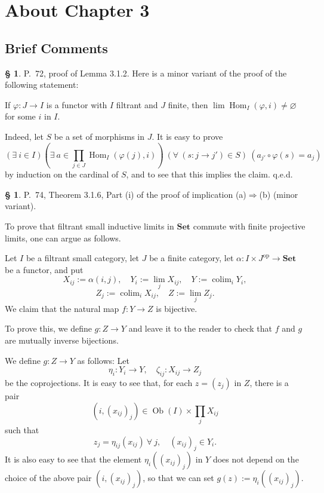 \documentclass[12pt]{article}
\theoremstyle{remark}
\theoremstyle{definition}
\newtheorem{s}[thm]{\S}
\newcommand{\Set}{\mathbf{Set}}
\newcommand{\pp}{\varphi}
\newcommand{\then}{\Rightarrow}
\DeclareMathOperator*{\colim}{colim}
\DeclareMathOperator{\Hom}{Hom}
\DeclareMathOperator{\Ob}{Ob}
\DeclareMathOperator{\op}{op}
\begin{document}

\section{About Chapter 3}

\subsection{Brief Comments}

\begin{s} 
P.~72, proof of Lemma 3.1.2. Here is a minor variant of the proof of the following statement: 

If $\pp:J\to I$ is a functor with $I$ filtrant and $J$ finite, then $\lim\Hom_I(\pp,i)\neq\varnothing$ for some $i$ in $I$. 

Indeed, let $S$ be a set of morphisms in $J$. It is easy to prove 
$$
(\exists\ i\in I)\left(\exists\ a\in\prod_{j\in J}\Hom_I(\pp(j),i)\right)\ (\forall\ (s:j\to j')\in S)\ (a_{j'}\circ\pp(s)=a_j) 
$$ 
by induction on the cardinal of $S$, and to see that this implies the claim. q.e.d.
\end{s}

%

\begin{s}%

P.~74, Theorem 3.1.6, Part (i) of the proof of implication (a)$\then$(b) (minor variant). 

To prove that filtrant small inductive limits in $\Set$ commute with finite projective limits, one can argue as follows. 

Let $I$ be a filtrant small category, let $J$ be a finite category, let $\alpha:I\times J^{\op}\to\Set$ be a functor, and put 
$$
X_{ij}:=\alpha(i,j),\quad Y_i:=\lim_jX_{ij},\quad Y:=\colim_iY_i,
$$
$$
Z_j:=\colim_iX_{ij},\quad Z:=\lim_jZ_j.
$$ 
We claim that the natural map $f:Y\to Z$ is bijective. 

To prove this, we define $g:Z\to Y$ and leave it to the reader to check that $f$ and $g$ are mutually inverse bijections. 

We define $g:Z\to Y$ as follows: Let 
$$
\eta_i:Y_i\to Y,\quad\zeta_{ij}:X_{ij}\to Z_j
$$ 
be the coprojections. It is easy to see that, for each $z=(z_j)$ in $Z$, there is a pair 
$$
(i,(x_{ij})_j)\in\Ob(I)\times\prod_jX_{ij}
$$ 
such that 
$$
z_j=\eta_{ij}(x_{ij})\ \forall\ j,\quad(x_{ij})_j\in Y_i. 
$$ 
It is also easy to see  that the element $\eta_i((x_{ij})_j)$ in $Y$ does not depend on the choice of the above pair $(i,(x_{ij})_j)$, so that we can set $g(z):=\eta_i((x_{ij})_j)$. 
\end{s}
\end{document}

